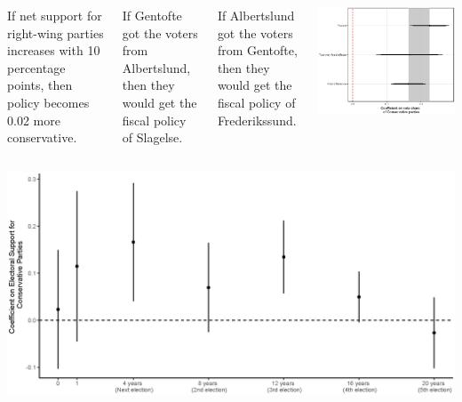 \documentclass[10pt,aspectratio=169]{beamer}
\begin{document}
\begin{frame}	
\begin{columns}
If net support for right-wing parties increases with 10 percentage points, then policy becomes 0.02 more conservative. 


\vspace{0.2in} \pause

 If Gentofte got the voters from Albertslund, then they would get the fiscal policy of Slagelse. 

\vspace{0.2in}

If Albertslund got the voters from Gentofte, then they would get the fiscal policy of Frederikssund.

\includegraphics[width=1\textwidth]{images/Newest_ggplot_coef.eps}

\end{columns}
\end{frame}

\begin{frame}			
\includegraphics[width=1\textwidth]{images/NoLag_varying_leads.eps}
\end{frame}
\end{document}
